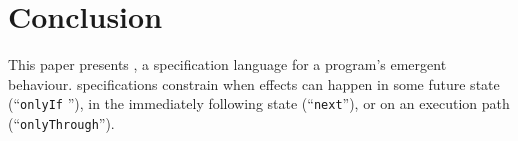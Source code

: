 \section{Conclusion}
\label{s:conclusion}




This paper presents 
\Nec, a specification language for a program's
emergent behaviour.
\Nec specifications
constrain when effects can happen in some future state
(``\texttt{\color{blue}onlyIf} ''),
in the immediately following state (``\texttt{\color{blue}next}''), or
on an execution path 
(``\texttt{\color{blue}onlyThrough}'').



 
